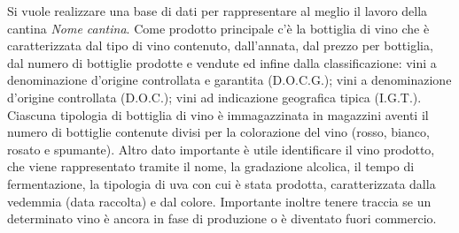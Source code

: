 Si vuole realizzare una base di dati per rappresentare al meglio il lavoro della cantina \emph{Nome cantina}. Come prodotto principale c'è la bottiglia di vino che è caratterizzata dal tipo di vino contenuto, dall'annata, dal prezzo per bottiglia, dal numero di bottiglie prodotte e vendute ed infine dalla classificazione: vini a denominazione d'origine controllata e garantita (D.O.C.G.); vini a denominazione d'origine controllata (D.O.C.); vini ad indicazione geografica tipica (I.G.T.). Ciascuna tipologia di bottiglia di vino è immagazzinata in magazzini aventi il numero di bottiglie contenute divisi per la colorazione del vino (rosso, bianco, rosato e spumante).
Altro dato importante è utile identificare il vino prodotto, che viene rappresentato tramite il nome, la gradazione alcolica, il tempo di fermentazione, la tipologia di uva con cui è stata prodotta, caratterizzata dalla vedemmia (data raccolta) e dal colore. Importante inoltre tenere traccia se un determinato vino è ancora in fase di produzione o è diventato fuori commercio. 